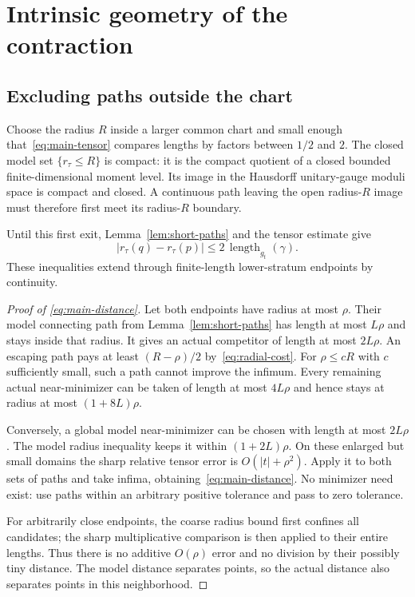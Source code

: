\section{Intrinsic geometry of the contraction}\label{sec:intrinsic}

\subsection{Excluding paths outside the chart}

Choose the radius $R$ inside a larger common chart and small enough
that~\eqref{eq:main-tensor} compares lengths by factors between
$1/2$ and $2$. The closed model set $\{r_\tau\le R\}$ is compact:
it is the compact quotient of a closed bounded finite-dimensional
moment level. Its image in the Hausdorff unitary-gauge moduli space
is compact and closed. A continuous path leaving the open radius-$R$
image must therefore first meet its radius-$R$ boundary.

Until this first exit, Lemma~\ref{lem:short-paths} and the tensor
estimate give
\begin{equation}\label{eq:radial-cost}
|r_\tau(q)-r_\tau(p)|\le2\,\operatorname{length}_{g_t}(\gamma).
\end{equation}
These inequalities extend through finite-length lower-stratum
endpoints by continuity.

\begin{proof}[Proof of \eqref{eq:main-distance}]
Let both endpoints have radius at most $\rho$. Their model
connecting path from Lemma~\ref{lem:short-paths} has length at most
$L\rho$ and stays inside that radius. It gives an actual competitor
of length at most $2L\rho$. An escaping path pays at least
$(R-\rho)/2$ by~\eqref{eq:radial-cost}. For $\rho\le cR$ with
$c$ sufficiently small, such a path cannot improve the infimum.
Every remaining actual near-minimizer can be taken of length at
most $4L\rho$ and hence stays at radius at most $(1+8L)\rho$.

Conversely, a global model near-minimizer can be chosen with length
at most $2L\rho$. The model radius inequality keeps it within
$(1+2L)\rho$. On these enlarged but small domains the sharp
relative tensor error is $O(|t|+\rho^2)$. Apply it to both sets
of paths and take infima, obtaining~\eqref{eq:main-distance}.
No minimizer need exist: use paths within an arbitrary positive
tolerance and pass to zero tolerance.

For arbitrarily close endpoints, the coarse radius bound first
confines all candidates; the sharp multiplicative comparison is
then applied to their entire lengths. Thus there is no additive
$O(\rho)$ error and no division by their possibly tiny distance.
The model distance separates points, so the actual distance also
separates points in this neighborhood.
\end{proof}

